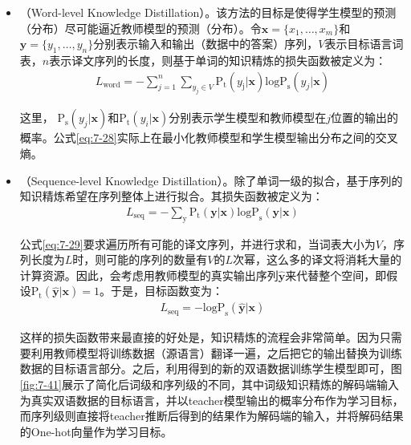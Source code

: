 \begin{itemize}
\vspace{0.5em}
\item {\small{}}（Word-level Knowledge Distillation）。该方法的目标是使得学生模型的预测（分布）尽可能逼近教师模型的预测（分布）。令$\mathbf{x}=\{x_1,\ldots,x_m\}$和$\mathbf{y}=\{y_1,\ldots,y_n\}$分别表示输入和输出（数据中的答案）序列，$V$表示目标语言词表，$n$表示译文序列的长度，则基于单词的知识精炼的损失函数被定义为：
\begin{eqnarray}
L_{\textrm{word}} = - \sum_{j=1}^n \sum_{y_j \in V} \textrm{P}_{\textrm{t}} (y_{\textrm{j}}|\mathbf{x})\textrm{logP}_{\textrm{s}}(y_j|\mathbf{x})
\label{eq:7-28}
\end{eqnarray}

这里， $\textrm{P}_{\textrm{s}}(y_j|\mathbf{x})$和$\textrm{P}_{\textrm{t}} (y_i|\mathbf{x})$分别表示学生模型和教师模型在$j$位置的输出的概率。公式\ref{eq:7-28}实际上在最小化教师模型和学生模型输出分布之间的交叉熵。
\vspace{0.5em}
\item {\small{}}（Sequence-level Knowledge Distillation）。除了单词一级的拟合，基于序列的知识精炼希望在序列整体上进行拟合。其损失函数被定义为：
\begin{eqnarray}
L_{\textrm{seq}} = - \sum_{\textrm{y}}\textrm{P}_{\textrm{t}} (\mathbf{y}|\mathbf{x})\textrm{logP}_{\textrm{s}}(\mathbf{y}|\mathbf{x})
\label{eq:7-29}
\end{eqnarray}

公式\ref{eq:7-29}要求遍历所有可能的译文序列，并进行求和，当词表大小为$V$，序列长度为$L$时，则可能的序列的数量有$V$的$L$次幂，这么多的译文将消耗大量的计算资源。因此，会考虑用教师模型的真实输出序列$\hat{\mathbf{y}}$来代替整个空间，即假设$\textrm{P}_{\textrm{t}}(\hat{\mathbf{y}}|\mathbf{x})=1$。于是，目标函数变为：
\begin{eqnarray}
L_{\textrm{seq}} = - \textrm{logP}_{\textrm{s}}(\hat{\mathbf{y}} | \mathbf{x})
\label{eq:7-30}
\end{eqnarray}

这样的损失函数带来最直接的好处是，知识精炼的流程会非常简单。因为只需要利用教师模型将训练数据（源语言）翻译一遍，之后把它的输出替换为训练数据的目标语言部分。之后，利用得到的新的双语数据训练学生模型即可，图\ref{fig:7-41}展示了简化后词级和序列级的不同，其中词级知识精炼的解码端输入为真实双语数据的目标语言，并以teacher模型输出的概率分布作为学习目标，而序列级则直接将teacher推断后得到的结果作为解码端的输入，并将解码结果的One-hot向量作为学习目标。
\vspace{0.5em}
\end{itemize}

